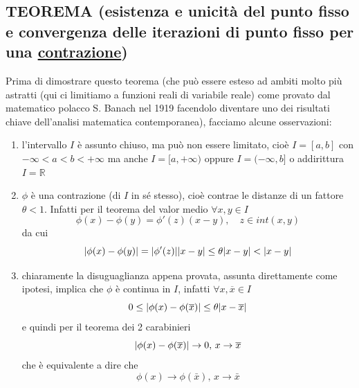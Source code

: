 \documentclass[12pt]{article}
\DeclarePairedDelimiter{\abs}{\lvert}{\rvert}
\begin{document}
\subsection{TEOREMA (esistenza e unicità del punto fisso e convergenza delle iterazioni di punto fisso per una \uline{contrazione})}
\begin{center}
\end{center}
Prima di dimostrare questo teorema (che può essere esteso ad ambiti molto più astratti (qui ci limitiamo a funzioni reali di variabile reale) come provato dal matematico polacco S. Banach nel 1919 facendolo diventare uno dei risultati chiave dell'analisi matematica contemporanea), facciamo alcune osservazioni:
\begin{enumerate}
    \item l'intervallo $I$ è assunto chiuso, ma può non essere limitato, cioè $I=[a,b]$ con $-\infty < a < b < +\infty$ ma anche $I=[a, +\infty)$ oppure $I = (-\infty,b]$ o addirittura $I=\mathbb{R}$
    \item $\phi$ è una contrazione (di $I$ in sé stesso), cioè contrae le distanze di un fattore $\theta < 1$. Infatti per il teorema del valor medio $\forall x,y \in I$
    \[ \phi(x)-\phi(y)=\phi'(z)(x-y), \quad z \in int(x,y) \]
    da cui
    \[ \abs{\phi(x)-\phi(y)}=\abs{\phi'(z)}\abs{x-y}\leq\theta\abs{x-y}<\abs{x-y}\]
    \item chiaramente la disuguaglianza appena provata, assunta direttamente come ipotesi, implica che $\phi$ è continua in $I$, infatti $\forall x,\overline{x}\in I$
    \[ 0 \leq \abs{\phi(x)-\phi(\overline{x})} \leq \theta \abs{x-\overline{x}} \]
    e quindi per il teorema dei 2 carabinieri
    \[ \abs{\phi(x)-\phi(\overline{x})} \rightarrow 0, \, x \rightarrow \overline{x} \]
    che è equivalente a dire che
    \[ \phi(x) \rightarrow \phi(\bar{x}),\, x \rightarrow \bar{x} \]
\end{enumerate}
\end{document}
